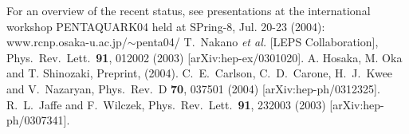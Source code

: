 \documentclass{annurep}
\begin{document}
\begin{thebibliography}{9}
%
\vspace*{-0.2cm}
For an overview of the recent status, see presentations at  
the international workshop PENTAQUARK04 held at SPring-8, 
Jul. 20-23 (2004):
www.rcnp.osaka-u.ac.jp/$\sim$penta04/
%
\vspace*{-0.2cm}
T.~Nakano {\it et al.}  [LEPS Collaboration],
Phys.\ Rev.\ Lett.\  {\bf 91}, 012002 (2003)
[arXiv:hep-ex/0301020].
%
\vspace*{-0.2cm}
A. Hosaka, M. Oka and T. Shinozaki, 
Preprint, (2004).  
%
\vspace*{-0.2cm}
C.~E.~Carlson, C.~D.~Carone, H.~J.~Kwee and V.~Nazaryan,
Phys.\ Rev.\ D {\bf 70}, 037501 (2004)
[arXiv:hep-ph/0312325].
%
\vspace*{-0.2cm}
R.~L.~Jaffe and F.~Wilczek,
Phys.\ Rev.\ Lett.\  {\bf 91}, 232003 (2003)
[arXiv:hep-ph/0307341].

\end{thebibliography}
\end{document}
